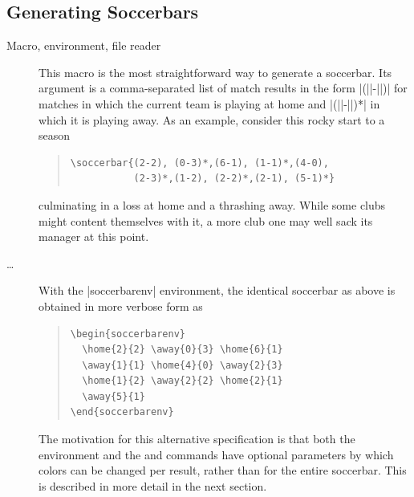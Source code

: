 \documentclass[a4paper,12pt]{ltxdoc}
\begin{document}
\subsection{Generating Soccerbars}\label{sec:macros}

Macro, environment, file reader

\begin{description}
\item[]
  This macro is the most straightforward way to generate a soccerbar.
  Its argument is a comma-separated list of match results
  in the form |(||-||)|
  for matches in which the current team is playing at home
  and |(||-||)*| 
  in which it is playing away.
  As an example, consider this rocky start to a season
  \begin{quote}
  \begin{verbatim}
\soccerbar{(2-2), (0-3)*,(6-1), (1-1)*,(4-0),
           (2-3)*,(1-2), (2-2)*,(2-1), (5-1)*}\end{verbatim}
  \end{quote}
  culminating in a loss at home
  and a thrashing away. 
  While some clubs might content themselves with it,
  a more club one may well sack its manager at this point.
\item[ \dots {}]
  With the |soccerbarenv| environment,
  the identical soccerbar as above is obtained in more verbose form as
  \begin{quote}
  \begin{verbatim}
\begin{soccerbarenv}
  \home{2}{2} \away{0}{3} \home{6}{1}
  \away{1}{1} \home{4}{0} \away{2}{3}
  \home{1}{2} \away{2}{2} \home{2}{1}
  \away{5}{1}
\end{soccerbarenv}\end{verbatim}
  \end{quote}
  The motivation for this alternative specification is that both the environment and 
  the  and  commands have optional parameters
  by which colors can be changed per result, rather than for the entire soccerbar. 
  This is described in more detail in the next section.
 

\end{description}
\end{document}
